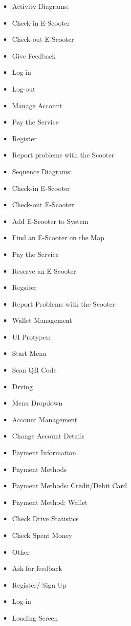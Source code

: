 \documentclass[a4paper, 12pt]{article}
\begin{document}
\begin{itemize}
\item Activity Diagrams:
	\item Check-in E-Scooter
	\item Check-out E-Scooter
	\item Give Feedback
	\item Log-in
	\item Log-out
	\item Manage Account
	\item Pay the Service
	\item Register
	\item Report problems with the Scooter
	
\item Sequence Diagrams:
	\item Check-in E-Scooter
	\item Check-out E-Scooter
	\item Add E-Scooter to System
	\item Find an E-Scooter on the Map
	\item Pay the Service
	\item Reserve an E-Scooter
	\item Regsiter
	\item Report Problems with the Scooter
	\item Wallet Management
		
\item UI Protypes: 
	\item Start Menu
	\item Scan QR Code
	\item Drving
	\item Menu Dropdown
	\item Account Management
	\item Change Account Details
	\item Payment Information
	\item Payment Methods
	\item Payment Methods: Credit/Debit Card
	\item Payment Method: Wallet
	\item Check Drive Statistics
	\item Check Spent Money
	\item Other
	\item Ask for feedback
	\item Register/ Sign Up
	\item Log-in
	\item Loading Screen
\end{itemize}
\end{document}

